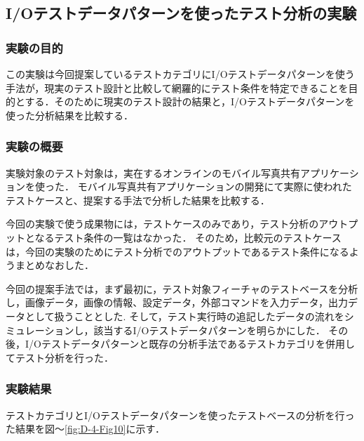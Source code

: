 \documentclass[10pt,a4j]{jarticle}
\begin{document}
\subsection{I/Oテストデータパターンを使ったテスト分析の実験} \label{sec:4-2}
\subsubsection{実験の目的} \label{sec:4-2-1}
この実験は今回提案しているテストカテゴリにI/Oテストデータパターンを使う手法が，現実のテスト設計と比較して網羅的にテスト条件を特定できることを目的とする．そのために現実のテスト設計の結果と，I/Oテストデータパターンを使った分析結果を比較する．

\subsubsection{実験の概要} \label{sec:4-2-3}

実験対象のテスト対象は，実在するオンラインのモバイル写真共有アプリケーションを使った．
モバイル写真共有アプリケーションの開発にて実際に使われたテストケースと、提案する手法で分析した結果を比較する．

今回の実験で使う成果物には，テストケースのみであり，テスト分析のアウトプットとなるテスト条件の一覧はなかった．
そのため，比較元のテストケースは，今回の実験のためにテスト分析でのアウトプットであるテスト条件になるようまとめなおした．

今回の提案手法では，まず最初に，テスト対象フィーチャのテストベースを分析し，画像データ，画像の情報、設定データ，外部コマンドを入力データ，出力データとして扱うこととした.
そして，テスト実行時の追記したデータの流れをシミュレーションし，該当するI/Oテストデータパターンを明らかにした．
その後，I/Oテストデータパターンと既存の分析手法であるテストカテゴリを併用してテスト分析を行った．

\subsubsection{実験結果} \label{sec:4-2-3}
テストカテゴリとI/Oテストデータパターンを使ったテストベースの分析を行った結果を図〜\ref {fig:D-4-Fig10}に示す．
\end{document}
